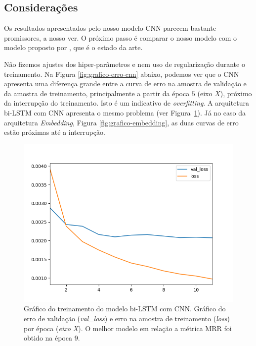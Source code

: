 \subsection{Considerações}

Os resultados apresentados pelo nosso modelo CNN parecem bastante promissores, a nosso ver. O próximo passo é comparar o nosso modelo com o modelo proposto por \cite{cambronero-deep-learning-code-search:2019}, que é o estado da arte. 

Não fizemos ajustes dos hiper-parâmetros e nem uso de regularização durante o treinamento. Na Figura \ref{fig:grafico-erro-cnn} abaixo, podemos ver que o CNN apresenta uma diferença grande entre a curva de erro na amostra de validação e da amostra de treinamento, principalmente a partir da época $5$ (eixo $X$), próximo da interrupção do treinamento. Isto é um indicativo de \textit{overfitting}. A arquitetura bi-LSTM com CNN apresenta o mesmo problema (ver Figura~\ref{fig:grafico-erro-bi-lstm-cnn}). Já no caso da arquitetura \textit{Embedding}, Figura \ref{fig:grafico-embedding}, as duas curvas de erro estão próximas até a interrupção. 

\begin{figure}[h]
    \centering
    \includegraphics[width=1\textwidth]{figuras/cap-resultados-preliminares/569229_ConvolutionalLSTM_plot.png}
    \caption{Gráfico do treinamento do modelo bi-LSTM com CNN. Gráfico do erro de validação (\emph{val\_loss}) e erro na amostra de treinamento (\emph{loss}) por época (\emph{eixo X}). O melhor modelo em relação a métrica MRR foi obtido na época $9$.}
    \label{fig:grafico-erro-bi-lstm-cnn}
\end{figure}

